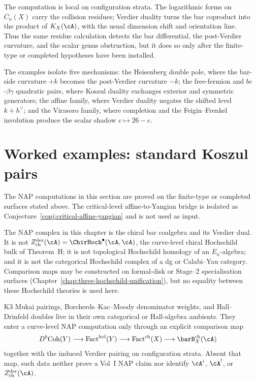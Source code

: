 The computation is local on configuration strata. The logarithmic
forms on $\overline{C}_n(X)$ carry the collision residues; Verdier
duality turns the bar coproduct into the product of
$K_X(\cA)$, with the usual dimension shift and orientation line.
Thus the same residue calculation detects the bar differential,
the post-Verdier curvature, and the scalar genus obstruction, but it
does so only after the finite-type or completed hypotheses have been
installed.

The examples isolate five mechanisms: the Heisenberg double pole,
where the bar-side curvature $+k$ becomes the post-Verdier curvature
$-k$; the free-fermion and $bc$-$\beta\gamma$ quadratic pairs, where
Koszul duality exchanges exterior and symmetric generators; the
affine family, where Verdier duality negates the shifted level
$k+h^\vee$; and the Virasoro family, where completion and the
Feigin--Frenkel involution produce the scalar shadow
$c\mapsto 26-c$.

\section{Worked examples: standard Koszul pairs}
\noindent
The NAP computations in this section are proved on the finite-type or
completed surfaces stated above. The critical-level affine-to-Yangian
bridge is isolated as Conjecture~\ref{conj:critical-affine-yangian}
and is not used as input.

\begin{remark}
\label{rem:nap-hochschild-separation}
The NAP complex in this chapter is the chiral bar coalgebra and its
Verdier dual. It is not
$Z^{\mathrm{der}}_{\mathrm{ch}}(\cA)
=\ChirHoch^\bullet(\cA,\cA)$, the curve-level chiral Hochschild
bulk of Theorem~H; it is not topological Hochschild homology of an
$E_n$-algebra; and it is not the categorical Hochschild complex of a
dg or Calabi--Yau category. Comparison maps may be constructed on
formal-disk or Stage--2 specialisation surfaces
(Chapter~\ref{chap:three-hochschild-unification}), but no equality
between these Hochschild theories is used here.
\end{remark}

\begin{remark}
\label{rem:nap-no-cy-hall-shortcut}
K3 Mukai pairings, Borcherds--Kac--Moody denominator weights, and
Hall--Drinfeld doubles live in their own categorical or Hall-algebra
ambients. They enter a curve-level NAP computation only through an
explicit comparison map
\[
D^b\mathrm{Coh}(Y)
\longrightarrow
\mathrm{Fact}^{\mathrm{hol}}(Y)
\longrightarrow
\mathrm{Fact}^{\mathrm{ch}}(X)
\longrightarrow
\barB_X^{\mathrm{ch}}(\cA)
\]
together with the induced Verdier pairing on configuration strata.
Absent that map, such data neither prove a Vol~I NAP claim nor
identify $\cA^i$, $\cA^!$, or
$Z^{\mathrm{der}}_{\mathrm{ch}}(\cA)$.
\end{remark}

